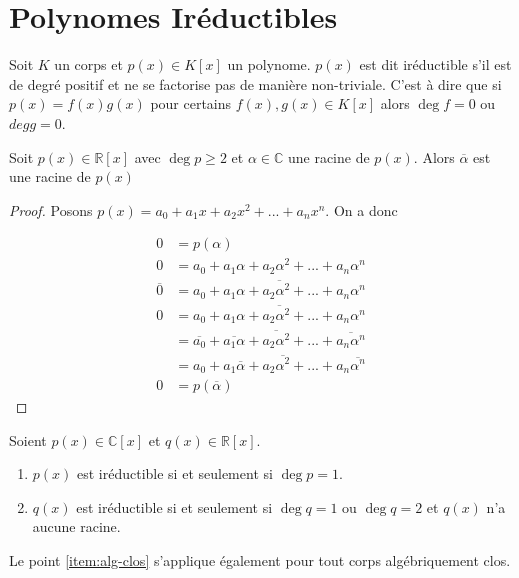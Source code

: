 \label{ch:alg-lin}
\section{Polynomes Iréductibles}
\label{sec:alg-lin-poly-ireduct}

\begin{defn}
Soit $K$ un corps et $p(x)\in K[x]$ un polynome. $p(x)$ est dit iréductible s'il est de degré positif et ne se factorise pas de manière non-triviale. C'est à dire que si $p(x)=f(x)g(x)$ pour certains $f(x),g(x)\in K[x]$ alors $\deg f=0$  ou $deg g=0$.
\end{defn}


\begin{lm}
\label{lm:alg-lin:complex-roots}
Soit $p(x)\in\mathbb{R}[x]$ avec $\deg p\geq2$ et $\alpha\in\mathbb{C}$ une racine  de  $p(x)$. Alors $\overline{\alpha}$ est une racine de $p(x)$
\end{lm}
\begin{proof}
Posons $p(x)=a_0+a_1x+a_2x^2+...+a_nx^n$. On a donc

\begin{align*}
0&=p(\alpha)\\
0&=a_0+a_1\alpha+a_2\alpha^2+...+a_n\alpha^n\\
\overline{0}&=\overline{a_0+a_1\alpha+a_2\alpha^2+...+a_n\alpha^n}\\
0&=\overline{a_0+a_1\alpha+a_2\alpha^2+...+a_n\alpha^n}\\
&=\overline{a_0}+\overline{a_1\alpha}+\overline{a_2\alpha^2}+...+\overline{a_n\alpha^n}\\
&=a_0+a_1\overline{\alpha}+a_2\overline{\alpha^2}+...+a_n\overline{\alpha^n}\\
0&=p(\overline{\alpha})
\end{align*}

\end{proof}
\begin{prop}
Soient $p(x)\in\mathbb{C}[x]$ et $q(x)\in\mathbb{R}[x]$.

\begin{enumerate}
\item\label{item:alg-clos} $p(x)$  est iréductible si et seulement si $\deg p=1$.
\item $q(x)$ est iréductible si et seulement si $\deg q=1$ ou $\deg q =2$ et $q(x)$ n'a aucune racine.
\end{enumerate}
Le point \ref{item:alg-clos} s'applique également pour tout corps algébriquement clos.
\end{prop}
